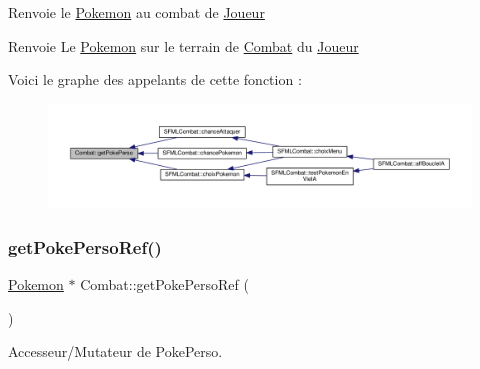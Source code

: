 Renvoie le \hyperlink{class_pokemon}{Pokemon} au combat de \hyperlink{class_joueur}{Joueur} \begin{DoxyReturn}{Renvoie}
Le \hyperlink{class_pokemon}{Pokemon} sur le terrain de \hyperlink{class_combat}{Combat} du \hyperlink{class_joueur}{Joueur} 
\end{DoxyReturn}
Voici le graphe des appelants de cette fonction \+:\nopagebreak
\begin{figure}[H]
\begin{center}
\leavevmode
\includegraphics[width=350pt]{class_combat_a6f3c9e5df27cfb30359dcb0425a45f6d_icgraph}
\end{center}
\end{figure}
\mbox{\label{class_combat_a9a44a83a9c1fe5d67f0b620dab547e56}} 
\subsubsection{\texorpdfstring{get\+Poke\+Perso\+Ref()}{getPokePersoRef()}}
{\footnotesize\ttfamily \hyperlink{class_pokemon}{Pokemon} $\ast$ Combat\+::get\+Poke\+Perso\+Ref (\begin{DoxyParamCaption}{ }\end{DoxyParamCaption})}



Accesseur/\+Mutateur de Poke\+Perso. 

